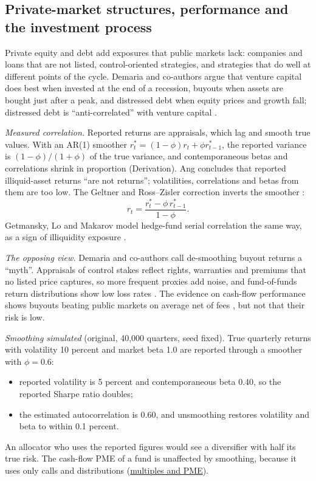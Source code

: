\subsection{Private-market structures, performance and the investment process}

\begin{qfmethod}\label{meth:private-capital-diversification}
 Private equity and debt add exposures that public markets lack: companies and loans that are not listed, control-oriented strategies, and strategies that do well at different points of the cycle. Demaria and co-authors argue that venture capital does best when invested at the end of a recession, buyouts when assets are bought just after a peak, and distressed debt when equity prices and growth fall; distressed debt is ``anti-correlated'' with venture capital \citep[pp.~162--163]{demaria-private-markets-2021}.

\emph{Measured correlation.} Reported returns are appraisals, which lag and smooth true values. With an AR(1) smoother $r^*_t=(1-\phi)r_t+\phi r^*_{t-1}$, the reported variance is $(1-\phi)/(1+\phi)$ of the true variance, and contemporaneous betas and correlations shrink in proportion (Derivation). Ang concludes that reported illiquid-asset returns ``are not returns''; volatilities, correlations and betas from them are too low. The Geltner and Ross--Zisler correction inverts the smoother \citep[pp.~416--421]{s7-ang}:
\[ r_t=\frac{r^*_t-\phi\,r^*_{t-1}}{1-\phi}. \]
Getmansky, Lo and Makarov model hedge-fund serial correlation the same way, as a sign of illiquidity exposure \citep[NBER WP 9571, abstract]{wide-getmansky-lo-makarov}.

\emph{The opposing view.} Demaria and co-authors call de-smoothing buyout returns a ``myth''. Appraisals of control stakes reflect rights, warranties and premiums that no listed price captures, so more frequent proxies add noise, and fund-of-funds return distributions show low loss rates \citep[pp.~160--166]{demaria-private-markets-2021}. The evidence on cash-flow performance shows buyouts beating public markets on average net of fees \citep[abstract]{pe-harris-jenkinson-kaplan-2014}, but not that their risk is low.

 \emph{Smoothing simulated} (original, 40,000 quarters, seed fixed). True quarterly returns with volatility 10 percent and market beta 1.0 are reported through a smoother with $\phi=0.6$:
\begin{itemize}
\item reported volatility is 5 percent and contemporaneous beta 0.40, so the reported Sharpe ratio doubles;
\item the estimated autocorrelation is 0.60, and unsmoothing restores volatility and beta to within 0.1 percent.
\end{itemize}
An allocator who uses the reported figures would see a diversifier with half its true risk. The cash-flow PME of a fund is unaffected by smoothing, because it uses only calls and distributions (\hyperref[meth:private-fund-multiples-pme]{multiples and PME}).


\end{qfmethod}
